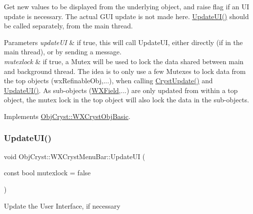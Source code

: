 Get new values to be displayed from the underlying object, and raise flag if an UI update is necessary. The actual G\+UI update is not made here. \mbox{\hyperlink{class_obj_cryst_1_1_w_x_cryst_menu_bar_a87182041080b9726b38292547632413f}{Update\+U\+I()}} should be called separately, from the main thread.


\begin{DoxyParams}{Parameters}
{\em update\+UI} & if true, this will call Update\+UI, either directly (if in the main thread), or by sending a message. \\
\hline
{\em mutexlock} & if true, a Mutex will be used to lock the data shared between main and background thread. The idea is to only use a few Mutexes to lock data from the top objects (wx\+Refinable\+Obj,...), when calling \mbox{\hyperlink{class_obj_cryst_1_1_w_x_cryst_menu_bar_a9cdd403a3463200227c2cdda64ad0317}{Cryst\+Update()}} and \mbox{\hyperlink{class_obj_cryst_1_1_w_x_cryst_menu_bar_a87182041080b9726b38292547632413f}{Update\+U\+I()}}. As sub-\/objects (\mbox{\hyperlink{class_obj_cryst_1_1_w_x_field}{W\+X\+Field}},...) are only updated from within a top object, the mutex lock in the top object will also lock the data in the sub-\/objects. \\
\hline
\end{DoxyParams}


Implements \mbox{\hyperlink{class_obj_cryst_1_1_w_x_cryst_obj_basic_a7ac00ae2ae28f1a6fa26e6fa571186b6}{Obj\+Cryst\+::\+W\+X\+Cryst\+Obj\+Basic}}.

\mbox{\label{class_obj_cryst_1_1_w_x_cryst_menu_bar_a87182041080b9726b38292547632413f}} 
\subsubsection{\texorpdfstring{UpdateUI()}{UpdateUI()}}
{\footnotesize\ttfamily void Obj\+Cryst\+::\+W\+X\+Cryst\+Menu\+Bar\+::\+Update\+UI (\begin{DoxyParamCaption}\item[{const bool}]{mutexlock = {\ttfamily false} }\end{DoxyParamCaption})\hspace{0.3cm}{\ttfamily [virtual]}}

Update the User Interface, if necessary


